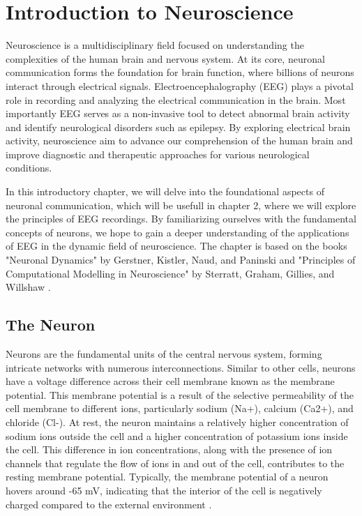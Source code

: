 \documentclass[a4paper, UKenglish, 11pt]{uiomaster}
\begin{document}
\chapter{Introduction to Neuroscience}
Neuroscience is a multidisciplinary field focused on understanding the complexities of the human brain and nervous system. At its core, neuronal communication forms the foundation for brain function, where billions of neurons interact through electrical signals. Electroencephalography (EEG) plays a pivotal role in recording and analyzing the electrical communication in the brain. Most importantly EEG serves as a non-invasive tool to detect abnormal brain activity and identify neurological disorders such as epilepsy. By exploring electrical brain activity, neuroscience aim to advance our comprehension of the human brain and improve diagnostic and therapeutic approaches for various neurological conditions.

In this introductory chapter, we will delve into the foundational aspects of neuronal communication, which will be usefull in chapter 2, where we will explore the principles of EEG recordings. By familiarizing ourselves with the fundamental concepts of neurons, we hope to gain a deeper understanding of the applications of EEG in the dynamic field of neuroscience. The chapter is based on the books "Neuronal Dynamics" by Gerstner, Kistler, Naud, and Paninski \cite{gerstner2014neuronal} and "Principles of Computational Modelling in Neuroscience" by Sterratt, Graham, Gillies, and Willshaw \cite{sterratt2011principles}.



\section{The Neuron}

Neurons are the fundamental units of the central nervous system, forming intricate networks with numerous interconnections. Similar to other cells, neurons have a voltage difference across their cell membrane known as the membrane potential. This membrane potential is a result of the selective permeability of the cell membrane to different ions, particularly sodium (Na+), calcium (Ca2+), and chloride (Cl-). At rest, the neuron maintains a relatively higher concentration of sodium ions outside the cell and a higher concentration of potassium ions inside the cell. This difference in ion concentrations, along with the presence of ion channels that regulate the flow of ions in and out of the cell, contributes to the resting membrane potential. Typically, the membrane potential of a neuron hovers around -65 mV, indicating that the interior of the cell is negatively charged compared to the external environment \cite{sterratt2011principles}.
\end{document}
